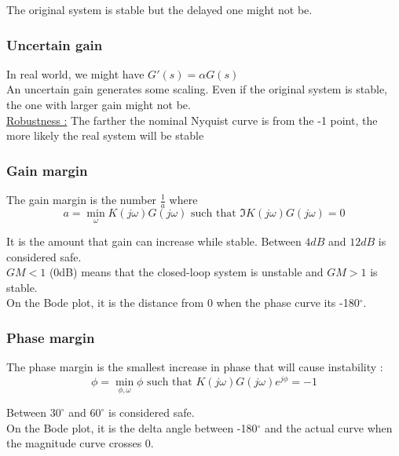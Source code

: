 \documentclass[../main.tex]{subfiles}
\begin{document}
The original system is stable but the delayed one might not be.\\

\subsubsection{Uncertain gain}
In real world, we might have $G'(s) = \alpha G(s)$\\
An uncertain gain generates some scaling. Even if the original system is stable, the one with larger gain might not be.\\

\quad \underline{Robustness :} The farther the nominal Nyquist curve is from the -1 point, the more likely the real system will be stable\\

\subsubsection{Gain margin}
The gain margin is the number $\frac{1}{a}$ where \begin{equation}
    a = \min_\omega K(j\omega) G(j\omega) \text{ such that } \Im K(j\omega) G(j\omega) = 0
\end{equation}

It is the amount that gain can increase while stable. Between $4dB$ and $12dB$ is considered safe. \\
$GM<1$ (0dB) means that the closed-loop system is unstable and $GM>1$ is stable.\\

On the Bode plot, it is the distance from 0 when the phase curve its -180$^\circ$.\\

\subsubsection{Phase margin}
The phase margin is the smallest increase in phase that will cause instability : \begin{equation}
    \phi = \min_{\phi, \omega} \phi \text{ such that } K(j\omega)G(j\omega) e^{j\phi} = -1
\end{equation}

Between $30^\circ$ and $60^\circ$ is considered safe.\\

On the Bode plot, it is the delta angle between -180$^\circ$ and the actual curve when the magnitude curve crosses 0.\\
\end{document}
